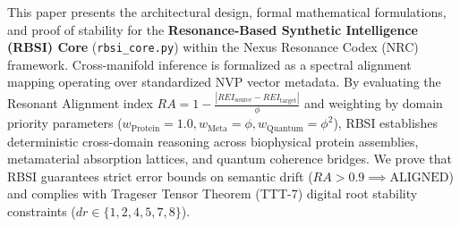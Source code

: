 \begin{abstractbox}
This paper presents the architectural design, formal mathematical formulations, and proof of stability for the \textbf{Resonance-Based Synthetic Intelligence (RBSI) Core} (\texttt{rbsi\_core.py}) within the Nexus Resonance Codex (NRC) framework. Cross-manifold inference is formalized as a spectral alignment mapping operating over standardized NVP vector metadata. By evaluating the Resonant Alignment index $RA = 1 - \frac{|REI_{\text{source}} - REI_{\text{target}}|}{\phi}$ and weighting by domain priority parameters ($w_{\text{Protein}} = 1.0, w_{\text{Meta}} = \phi, w_{\text{Quantum}} = \phi^2$), RBSI establishes deterministic cross-domain reasoning across biophysical protein assemblies, metamaterial absorption lattices, and quantum coherence bridges. We prove that RBSI guarantees strict error bounds on semantic drift ($RA > 0.9 \implies \text{ALIGNED}$) and complies with Trageser Tensor Theorem (TTT-7) digital root stability constraints ($dr \in \{1, 2, 4, 5, 7, 8\}$).
\end{abstractbox}
